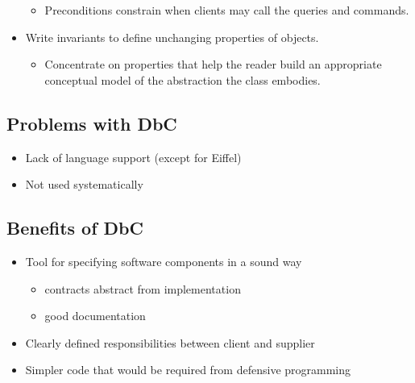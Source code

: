 \begin{itemize}
  \begin{itemize}
  \tightlist
  \item
    Preconditions constrain when clients may call the queries and
    commands.
  \end{itemize}
\item
  Write invariants to define unchanging properties of objects.

  \begin{itemize}
  \tightlist
  \item
    Concentrate on properties that help the reader build an appropriate
    conceptual model of the abstraction the class embodies.
  \end{itemize}
\end{itemize}

\hypertarget{problems-with-dbc}{%
\subsection{Problems with DbC}\label{problems-with-dbc}}

\begin{itemize}
\tightlist
\item
  Lack of language support (except for Eiffel)
\item
  Not used systematically
\end{itemize}

\hypertarget{benefits-of-dbc}{%
\subsection{Benefits of DbC}\label{benefits-of-dbc}}

\begin{itemize}
\tightlist
\item
  Tool for specifying software components in a sound way

  \begin{itemize}
  \tightlist
  \item
    contracts abstract from implementation
  \item
    good documentation
  \end{itemize}
\item
  Clearly defined responsibilities between client and supplier
\item
  Simpler code that would be required from defensive programming
\end{itemize}

\clearpage